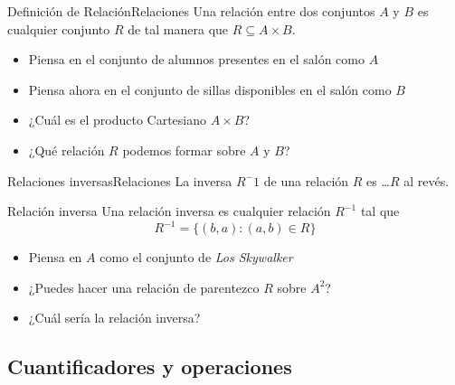 \documentclass[spanish, c]{beamer}
\begin{document}
\begin{frame}{Definición de Relación}{Relaciones}
    Una \alert{relación} entre dos conjuntos $A$ y $B$ es cualquier conjunto $R$ de tal manera que $R \subseteq A \times B$. \pause

    \bigskip

    \begin{itemize}
        \item Piensa en el conjunto de alumnos presentes en el salón como $A$ \pause
        \item Piensa ahora en el conjunto de sillas disponibles en el salón como $B$ \pause
        \item ¿Cuál es el producto Cartesiano $A \times B$? \pause
        \item ¿Qué relación $R$ podemos formar sobre $A$ y $B$?
    \end{itemize} \pause

\end{frame}

\begin{frame}{Relaciones inversas}{Relaciones}
    La \alert{inversa} $R^-1$ de una relación $R$ es \dots $R$ al revés.

    \bigskip
    
    \begin{block}{Relación inversa}
        Una relación inversa es cualquier relación $R^{-1}$ tal que
        $$R^{-1} = \{(b, a) : (a, b) \in R\}$$
    \end{block} \pause

    \bigskip

    \begin{itemize}
        \item Piensa en $A$ como el conjunto de \textit{Los Skywalker} \pause
        \item ¿Puedes hacer una relación de parentezco $R$ sobre $A^2$? \pause
        \item ¿Cuál sería la relación inversa?
    \end{itemize}

\end{frame}

\subsection{Cuantificadores y operaciones}
\end{document}
